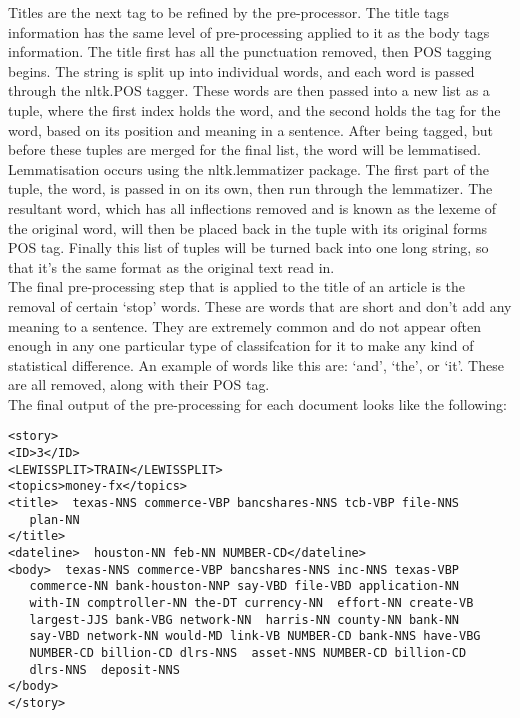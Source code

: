 \documentclass[11pt]{article}
\begin{document}
Titles are the next tag to be refined by the pre-processor. The title tags information has the same level of pre-processing applied to it as the body tags information. The title first has all the punctuation removed, then POS tagging begins. The string is split up into individual words, and each word is passed through the nltk.POS tagger. These words are then passed into a new list as a tuple, where the first index holds the word, and the second holds the tag for the word, based on its position and meaning in a sentence. After being tagged, but before these tuples are merged for the final list, the word will be lemmatised. \\

Lemmatisation occurs using the nltk.lemmatizer package. The first part of the tuple, the word, is passed in on its own, then run through the lemmatizer. The resultant word, which has all inflections removed and is known as the lexeme of the original word, will then be placed back in the tuple with its original forms POS tag. Finally this list of tuples will be turned back into one long string, so that it’s the same format as the original text read in. \\

The final pre-processing step that is applied to the title of an article is the removal of certain ‘stop’ words. These are words that are short and don’t add any meaning to a sentence. They are extremely common and do not appear often enough in any one particular type of classifcation for it to make any kind of statistical difference. An example of words like this are: ‘and’, ‘the’, or ‘it’. These are all removed, along with their POS tag. \\

The final output of the pre-processing for each document looks like the following:

\begin{lstlisting}[frame=single]
<story>
<ID>3</ID>
<LEWISSPLIT>TRAIN</LEWISSPLIT>
<topics>money-fx</topics>
<title>  texas-NNS commerce-VBP bancshares-NNS tcb-VBP file-NNS
   plan-NN
</title>
<dateline>  houston-NN feb-NN NUMBER-CD</dateline>
<body>  texas-NNS commerce-VBP bancshares-NNS inc-NNS texas-VBP
   commerce-NN bank-houston-NNP say-VBD file-VBD application-NN
   with-IN comptroller-NN the-DT currency-NN  effort-NN create-VB
   largest-JJS bank-VBG network-NN  harris-NN county-NN bank-NN
   say-VBD network-NN would-MD link-VB NUMBER-CD bank-NNS have-VBG
   NUMBER-CD billion-CD dlrs-NNS  asset-NNS NUMBER-CD billion-CD
   dlrs-NNS  deposit-NNS
</body>
</story>
\end{lstlisting}
\end{document}
